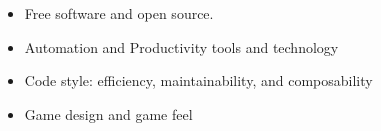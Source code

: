 \documentclass{res}
\newcommand{\inFrench}[1]{}
\newcommand{\inEnglish}[1]{#1}
\begin{document}
\begin{resume}
\inEnglish{
	\vspace{6pt}
	\begin{itemize} \itemsep -2pt
		\item Free software and open source.
		\item Automation and Productivity tools and technology
		\item Code style: efficiency, maintainability, and composability
		\item Game design and game feel
	\end{itemize}
}

%

\end{resume}
\end{document}

